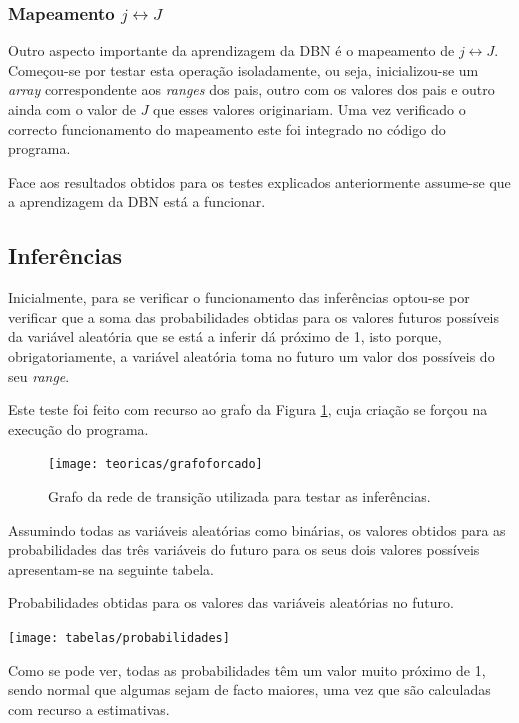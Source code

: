 \documentclass[10pt]{article}
\numberwithin{equation}{section}
\begin{document}
\subsubsection{Mapeamento $j \leftrightarrow J$}

Outro aspecto importante da aprendizagem da DBN é o mapeamento de $j \leftrightarrow J$. Começou-se por testar esta operação isoladamente, ou seja, inicializou-se um \textit{array} correspondente aos \textit{ranges} dos pais, outro com os valores dos pais e outro ainda com o valor de $J$ que esses valores originariam. Uma vez verificado o correcto funcionamento do mapeamento este foi integrado no código do programa.

Face aos resultados obtidos para os testes explicados anteriormente assume-se que a aprendizagem da DBN está a funcionar.

\subsection{Inferências}

Inicialmente, para se verificar o funcionamento das inferências optou-se por verificar que a soma das probabilidades obtidas para os valores futuros possíveis da variável aleatória que se está a inferir dá próximo de 1, isto porque, obrigatoriamente, a variável aleatória toma no futuro um valor dos possíveis do seu \textit{range}. 

Este teste foi feito com recurso ao grafo da Figura \ref{fig:grafoforcado}, cuja criação se forçou na execução do programa.

\begin{figure}[H]
	\centering
	\texttt{[image: teoricas/grafoforcado]}
	\caption{Grafo da rede de transição utilizada para testar as inferências.}
	\vspace{-0.8em}
	\label{fig:grafoforcado}
\end{figure}

Assumindo todas as variáveis aleatórias como binárias, os valores obtidos para as probabilidades das três variáveis do futuro para os seus dois valores possíveis apresentam-se na seguinte tabela.

\begin{table}[H]
	\centering
	\caption{Probabilidades obtidas para os valores das variáveis aleatórias no futuro.}
	\vspace{-1.5mm}
	\texttt{[image: tabelas/probabilidades]}
\end{table}

\vspace{-1.5mm}
Como se pode ver, todas as probabilidades têm um valor muito próximo de 1, sendo normal que algumas sejam de facto maiores, uma vez que são calculadas com recurso a estimativas.
\end{document}
